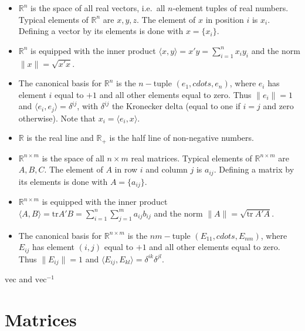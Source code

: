 \documentclass[
  12pt,
  letterpaper,
  DIV=11,
  numbers=noendperiod]{scrreprt}
\theoremstyle{remark}
\begin{document}
\begin{itemize}
\item
  \(\mathbb{R}^n\) is the space of all real vectors, i.e.~all
  \(n\)-element tuples of real numbers. Typical elements of
  \(\mathbb{R}^n\) are \(x,y,z\). The element of \(x\) in position \(i\)
  is \(x_i\). Defining a vector by its elements is done with
  \(x=\{x_i\}\).
\item
  \(\mathbb{R}^n\) is equipped with the inner product
  \(\langle x,y\rangle=x'y=\sum_{i=1}^nx_iy_i\) and the norm
  \(\|x\|=\sqrt{x'x}\).
\item
  The canonical basis for \(\mathbb{R}^n\) is the \(n-\)tuple
  \((e_1,cdots,e_n)\), where \(e_i\) has element \(i\) equal to \(+1\)
  and all other elements equal to zero. Thus \(\|e_i\|=1\) and
  \(\langle e_i,e_j\rangle=\delta^{ij}\), with \(\delta^{ij}\) the
  Kronecker delta (equal to one if \(i=j\) and zero otherwise). Note
  that \(x_i=\langle e_i,x\rangle\).
\item
  \(\mathbb{R}\) is the real line and \(\mathbb{R}_+\) is the half line
  of non-negative numbers.
\item
  \(\mathbb{R}^{n\times m}\) is the space of all \(n\times m\) real
  matrices. Typical elements of \(\mathbb{R}^{n\times m}\) are
  \(A,B,C\). The element of \(A\) in row \(i\) and column \(j\) is
  \(a_{ij}\). Defining a matrix by its elements is done with
  \(A=\{a_{ij}\}\).
\item
  \(\mathbb{R}^{n\times m}\) is equipped with the inner product
  \(\langle A,B\rangle=\text{tr} A'B=\sum_{i=1}^n\sum_{j=1}^ma_{ij}b_{ij}\)
  and the norm \(\|A\|=\sqrt{\text{tr}\ A'A}\).
\item
  The canonical basis for \(\mathbb{R}^{n\times m}\) is the \(nm-\)tuple
  \((E_{11},cdots,E_{nm})\), where \(E_{ij}\) has element \((i,j)\)
  equal to \(+1\) and all other elements equal to zero. Thus
  \(\|E_{ij}\|=1\) and
  \(\langle E_{ij},E_{kl}\rangle=\delta^{ik}\delta^{jl}\).
\end{itemize}

\(\text{vec}\) and \(\text{vec}^{-1}\)

\section*{Matrices}\label{matrices}

\end{document}
